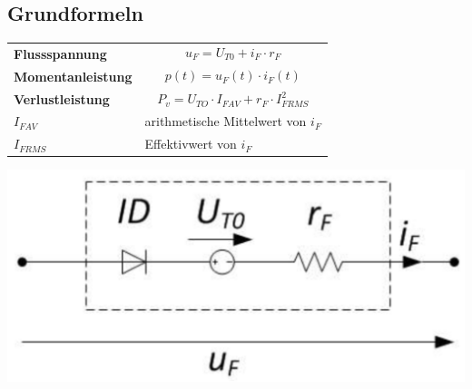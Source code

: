 \begin{multicols}{2}
\subsection{Grundformeln}
\begin{tabular}{ll}
    \textbf{Flussspannung}&\[ u_F = U_{T0} + i_F \cdot r_F \]\\
    \textbf{Momentanleistung}&\[ p(t)=u_F(t)\cdot i_F(t) \]\\
    \textbf{Verlustleistung}&\[ P_v=U_{TO}\cdot I_{FAV}+r_F\cdot I_{FRMS}^2 \]\\
    $ I_{FAV}$ & arithmetische Mittelwert von $ i_F $\\
    $ I_{FRMS} $ & Effektivwert von $ i_F $\\    
\end{tabular}

\hspace{0.5cm}\includegraphics[width=0.6\linewidth]{images/ESBDiode} 
\end{multicols}

